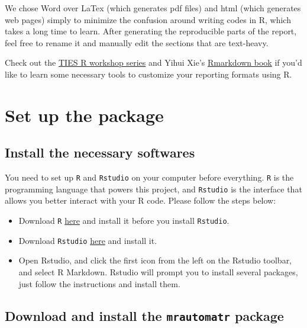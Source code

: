 \documentclass[
]{book}
\providecommand{\tightlist}{%
  \setlength{\itemsep}{0pt}\setlength{\parskip}{0pt}}
\begin{document}
We chose Word over LaTex (which generates pdf files) and html (which generates web pages) simply to minimize the confusion around writing codes in R, which takes a long time to learn. After generating the reproducible parts of the report, feel free to rename it and manually edit the sections that are text-heavy.

Check out the \href{https://github.com/nyuglobalties/workshops}{TIES R workshop series} and Yihui Xie's \href{https://bookdown.org/yihui/rmarkdown/}{Rmarkdown book} if you'd like to learn some necessary tools to customize your reporting formats using R.

\hypertarget{set-up-the-package}{%
\chapter{Set up the package}\label{set-up-the-package}}

\hypertarget{install-the-necessary-softwares}{%
\section{Install the necessary softwares}\label{install-the-necessary-softwares}}

You need to set up \texttt{R} and \texttt{Rstudio} on your computer before everything. \texttt{R} is the programming language that powers this project, and \texttt{Rstudio} is the interface that allows you better interact with your R code. Please follow the steps below:

\begin{itemize}
\tightlist
\item
  Download \texttt{R} \href{https://cran.r-project.org/mirrors.html}{here} and install it before you install \texttt{Rstudio}.
\item
  Download \texttt{Rstudio} \href{https://rstudio.com/products/rstudio/download/\#download}{here} and install it.
\item
  Open Rstudio, and click the first icon from the left on the Rstudio toolbar, and select R Markdown. Rstudio will prompt you to install several packages, just follow the instructions and install them.
\end{itemize}

\hypertarget{download-and-install-the-mrautomatr-package}{%
\section{\texorpdfstring{Download and install the \texttt{mrautomatr} package}{Download and install the mrautomatr package}}\label{download-and-install-the-mrautomatr-package}}
\end{document}
